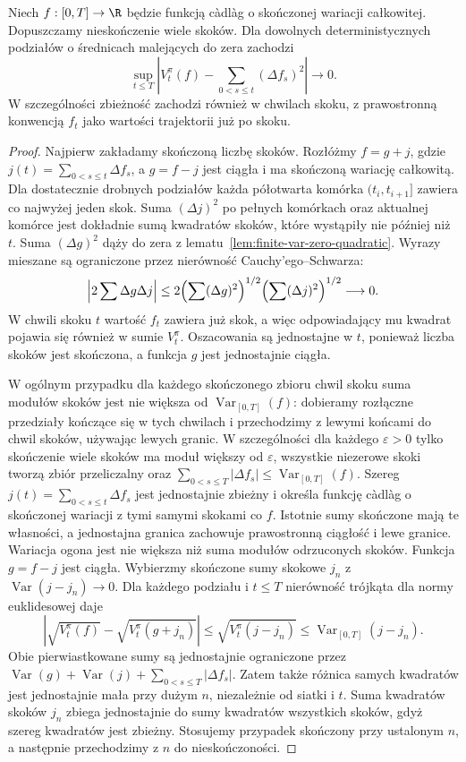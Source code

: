 \begin{lemat}
\label{lem:cadlag-finite-variation-qv}
Niech $f:[0,T]\to\R$ będzie funkcją c\`adl\`ag
o skończonej wariacji całkowitej.
Dopuszczamy nieskończenie wiele skoków. Dla dowolnych deterministycznych podziałów
o średnicach malejących do zera zachodzi
\[
\sup_{t\le T}\left|V_t^\pi(f)-
\sum_{0<s\le t}(\Delta f_s)^2\right|\longrightarrow0.
\]
W szczególności zbieżność zachodzi również w chwilach
skoku, z prawostronną konwencją $f_t$ jako wartości
trajektorii już po skoku.
\end{lemat}
\begin{proof}
Najpierw zakładamy skończoną liczbę skoków.
Rozłóżmy $f=g+j$, gdzie
$j(t)=\sum_{0<s\le t}\Delta f_s$,
a $g=f-j$ jest ciągła i ma skończoną wariację
całkowitą. Dla dostatecznie drobnych podziałów
każda półotwarta komórka $(t_i,t_{i+1}]$
zawiera co najwyżej jeden skok.
Suma $(\Delta j)^2$ po pełnych komórkach oraz
aktualnej komórce jest dokładnie sumą kwadratów
skoków, które wystąpiły nie później niż $t$. Suma $(\Delta g)^2$ dąży do zera
z lematu~\ref{lem:finite-var-zero-quadratic}. Wyrazy mieszane są
ograniczone przez nierówność Cauchy'ego--Schwarza:
\[
\left|2\sum\Delta g\Delta j\right|
\le2\Bigl(\sum(\Delta g)^2\Bigr)^{1/2}
\Bigl(\sum(\Delta j)^2\Bigr)^{1/2}\longrightarrow0.
\]
W chwili skoku $t$ wartość $f_t$ zawiera już skok,
a więc odpowiadający mu kwadrat pojawia się również
w sumie $V_t^\pi$. Oszacowania są jednostajne w $t$,
ponieważ liczba skoków jest skończona, a funkcja $g$
jest jednostajnie ciągła.

W ogólnym przypadku dla każdego skończonego zbioru
chwil skoku suma modułów skoków jest nie większa
od $\operatorname{Var}_{[0,T]}(f)$: dobieramy rozłączne
przedziały kończące się w tych chwilach i przechodzimy
z lewymi końcami do chwil skoków, używając lewych granic.
W szczególności dla każdego $\varepsilon>0$ tylko
skończenie wiele skoków ma moduł większy od
$\varepsilon$, wszystkie niezerowe skoki tworzą
zbiór przeliczalny oraz
$\sum_{0<s\le T}|\Delta f_s|\le\operatorname{Var}_{[0,T]}(f)$.
Szereg $j(t)=\sum_{0<s\le t}\Delta f_s$
jest jednostajnie zbieżny i określa funkcję
c\`adl\`ag o skończonej wariacji z tymi samymi
skokami co $f$. Istotnie sumy skończone mają
te własności, a jednostajna granica zachowuje
prawostronną ciągłość i lewe granice.
Wariacja ogona jest nie większa niż suma modułów
odrzuconych skoków. Funkcja $g=f-j$ jest ciągła.
Wybierzmy skończone sumy skokowe $j_n$ z
$\operatorname{Var}(j-j_n)\to0$.
Dla każdego podziału i $t\le T$ nierówność
trójkąta dla normy euklidesowej daje
\[
\left|\sqrt{V_t^\pi(f)}-\sqrt{V_t^\pi(g+j_n)}\right|
\le\sqrt{V_t^\pi(j-j_n)}
\le\operatorname{Var}_{[0,T]}(j-j_n).
\]
Obie pierwiastkowane sumy są jednostajnie
ograniczone przez
$\operatorname{Var}(g)+\operatorname{Var}(j)+
\sum_{0<s\le T}|\Delta f_s|$.
Zatem także różnica samych kwadratów jest
jednostajnie mała przy dużym $n$, niezależnie
od siatki i $t$. Suma kwadratów skoków
$j_n$ zbiega jednostajnie do sumy kwadratów
wszystkich skoków, gdyż szereg kwadratów
jest zbieżny. Stosujemy przypadek skończony
przy ustalonym $n$, a następnie przechodzimy
z $n$ do nieskończoności.
\end{proof}

